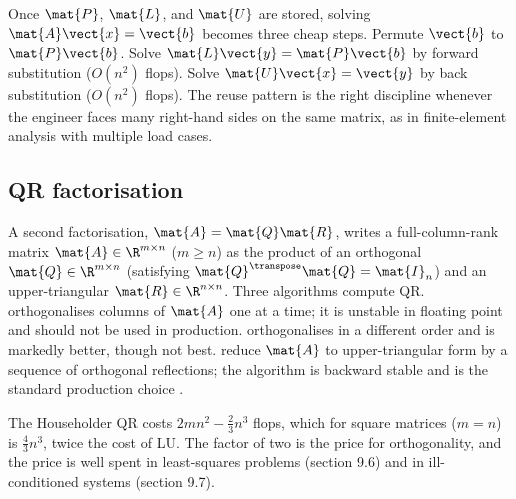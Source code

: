 Once $\mat{P}$, $\mat{L}$, and $\mat{U}$ are stored, solving
$\mat{A}\vect{x} = \vect{b}$ becomes three cheap steps. Permute
$\vect{b}$ to $\mat{P}\vect{b}$. Solve $\mat{L}\vect{y} =
\mat{P}\vect{b}$ by forward substitution ($O(n^{2})$ flops). Solve
$\mat{U}\vect{x} = \vect{y}$ by back substitution ($O(n^{2})$
flops). The reuse pattern is the right discipline whenever the
engineer faces many right-hand sides on the same matrix, as in
finite-element analysis with multiple load cases.

\subsection{QR factorisation}

A second factorisation, $\mat{A} = \mat{Q}\mat{R}$, writes a
full-column-rank matrix $\mat{A} \in \R^{m \times n}$ ($m \geq n$)
as the product of an orthogonal $\mat{Q} \in \R^{m \times n}$
(satisfying $\mat{Q}^{\transpose}\mat{Q} = \mat{I}_{n}$) and an
upper-triangular $\mat{R} \in \R^{n \times n}$. Three algorithms
compute QR.  orthogonalises columns
of $\mat{A}$ one at a time; it is unstable in floating point and
should not be used in production. 
orthogonalises in a different order and is markedly better, though
not best.  reduce $\mat{A}$ to
upper-triangular form by a sequence of orthogonal reflections; the
algorithm is backward stable and is the standard production choice
\cite[ch.~10]{text:trefethen-bau1997}.

The Householder QR costs $2mn^{2} - \tfrac{2}{3}n^{3}$ flops, which
for square matrices ($m = n$) is $\tfrac{4}{3}n^{3}$, twice the cost
of LU. The factor of two is the price for orthogonality, and the
price is well spent in least-squares problems (section 9.6) and in
ill-conditioned systems (section 9.7).

